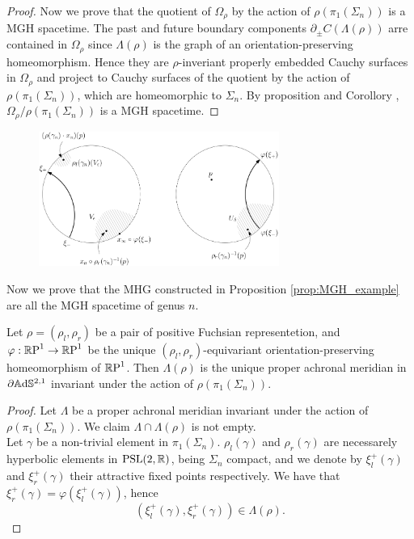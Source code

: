 \begin{proof}
    Now we prove that the quotient of $\Omega_\rho$ by the action of $\rho(\pi_1(\Sigma_n))$ is a MGH spacetime. The past and future boundary components $\partial_\pm C(\Lambda(\rho))$ arre contained in $\Omega_\rho$ since $\Lambda(\rho)$ is the graph of an orientation-preserving homeomorphism. Hence they are $\rho$-inveriant properly embedded Cauchy surfaces in $\Omega_\rho$ and project to Cauchy surfaces of the quotient by the action of $\rho(\pi_1(\Sigma_n))$, which are homeomorphic to $\Sigma_n$. By proposition  and Corollory , $\Omega_\rho / \rho(\pi_1(\Sigma_n))$ is a MGH spacetime.
\end{proof}
\begin{figure}
    \centering
    \includegraphics[width=0.7\textwidth]{dynamics.png}
    \caption{}
\end{figure}
Now we prove that the MHG constructed in Proposition \ref{prop:MGH_example} are all the MGH spacetime of genus $n$.
\begin{lemma}
    Let $\rho=(\rho_l,\rho_r)$ be a pair of positive Fuchsian representetion, and $\varphi :\S \to \S$ be the unique $(\rho_l,\rho_r)$-equivariant orientation-preserving homeomorphism of $\S$. Then $\Lambda(\rho)$ is the unique proper achronal meridian in $\partial \A^{2,1}$ invariant under the action of $\rho(\pi_1(\Sigma_n))$.
\end{lemma}
\begin{proof} 
    Let $\Lambda$ be a proper achronal meridian invariant under the action of $\rho(\pi_1(\Sigma_n))$. We claim $\Lambda \cap \Lambda(\rho)$ is not empty.\\
    Let $\gamma$ be a non-trivial element in $\pi_1(\Sigma_n)$. $\rho_l(\gamma)$ and $\rho_r(\gamma)$ are necessarely hyperbolic elements in $\PSL$, being $\Sigma_n$ compact, and we denote by $\xi^+_l(\gamma)$ and $\xi^+_r(\gamma)$ their attractive fixed points respectively. We have that $\xi^+_r(\gamma) = \varphi(\xi^+_l(\gamma))$, hence
    \[
        (\xi^+_l(\gamma), \xi^+_r(\gamma)) \in \Lambda(\rho).
    \] 
\end{proof}
